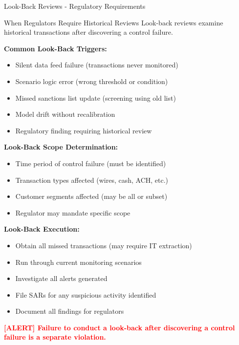 \documentclass[11pt,a4paper]{beamer}
\newcommand{\redflag}[1]{\textcolor{red}{\textbf{[ALERT] #1}}}
\begin{document}
	\begin{frame}{Look-Back Reviews - Regulatory Requirements}
	\begin{block}{When Regulators Require Historical Reviews}
		Look-back reviews examine historical transactions after discovering a control failure.
	\end{block}
	
	\textbf{Common Look-Back Triggers:}
	\begin{itemize}
		\item Silent data feed failure (transactions never monitored)
		\item Scenario logic error (wrong threshold or condition)
		\item Missed sanctions list update (screening using old list)
		\item Model drift without recalibration
		\item Regulatory finding requiring historical review
	\end{itemize}
	
	\textbf{Look-Back Scope Determination:}
	\begin{itemize}
		\item Time period of control failure (must be identified)
		\item Transaction types affected (wires, cash, ACH, etc.)
		\item Customer segments affected (may be all or subset)
		\item Regulator may mandate specific scope
	\end{itemize}
	
	\textbf{Look-Back Execution:}
	\begin{itemize}
		\item Obtain all missed transactions (may require IT extraction)
		\item Run through current monitoring scenarios
		\item Investigate all alerts generated
		\item File SARs for any suspicious activity identified
		\item Document all findings for regulators
	\end{itemize}
	
	\redflag{Failure to conduct a look-back after discovering a control failure is a separate violation.}
	\end{frame}
	
\end{document}
